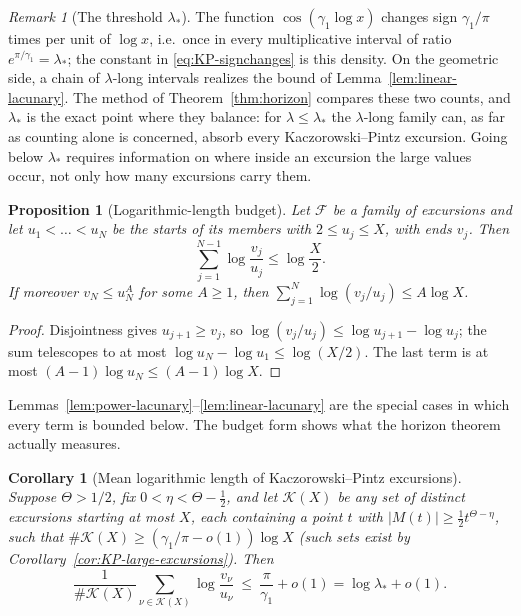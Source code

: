 \documentclass[11pt]{amsart}
\numberwithin{equation}{section}
\theoremstyle{plain}
\newtheorem{proposition}[theorem]{Proposition}
\newtheorem{corollary}[theorem]{Corollary}
\theoremstyle{definition}
\theoremstyle{remark}
\newtheorem{remark}[theorem]{Remark}
\newcommand{\F}{\mathcal{F}}
\begin{document}
\begin{remark}[The threshold $\lambda_*$]
\label{rem:lambda-star}
The function $\cos(\gamma_1\log x)$ changes sign $\gamma_1/\pi$ times per
unit of $\log x$, i.e.\ once in every multiplicative interval of ratio
$e^{\pi/\gamma_1}=\lambda_*$; the constant in \eqref{eq:KP-signchanges} is
this density. On the geometric side, a chain of $\lambda$-long intervals
realizes the bound of Lemma~\ref{lem:linear-lacunary}. The method of
Theorem~\ref{thm:horizon} compares these two counts, and $\lambda_*$ is the
exact point where they balance: for $\lambda\le\lambda_*$ the $\lambda$-long
family can, as far as counting alone is concerned, absorb every
Kaczorowski--Pintz excursion. Going below $\lambda_*$ requires information
on where inside an excursion the large values occur, not only how many
excursions carry them.
\end{remark}

\begin{proposition}[Logarithmic-length budget]
\label{prop:log-budget}
Let $\F$ be a family of excursions and let $u_1<\dots<u_N$ be the starts of
its members with $2\le u_j\le X$, with ends $v_j$. Then
\[
\sum_{j=1}^{N-1}\log\frac{v_j}{u_j}\le\log\frac X2 .
\]
If moreover $v_N\le u_N^A$ for some $A\ge1$, then
$\sum_{j=1}^{N}\log(v_j/u_j)\le A\log X$.
\end{proposition}

\begin{proof}
Disjointness gives $u_{j+1}\ge v_j$, so
$\log(v_j/u_j)\le\log u_{j+1}-\log u_j$; the sum telescopes to at most
$\log u_N-\log u_1\le\log(X/2)$. The last term is at most
$(A-1)\log u_N\le(A-1)\log X$.
\end{proof}

Lemmas~\ref{lem:power-lacunary}--\ref{lem:linear-lacunary} are the special
cases in which every term is bounded below. The budget form shows what the
horizon theorem actually measures.

\begin{corollary}[Mean logarithmic length of Kaczorowski--Pintz excursions]
\label{cor:KP-mean-log-length}
Suppose $\Theta>1/2$, fix $0<\eta<\Theta-\frac12$, and let $\mathcal K(X)$
be any set of distinct excursions starting at most $X$, each containing a
point $t$ with $|M(t)|\ge\frac12t^{\Theta-\eta}$, such that
$\#\mathcal K(X)\ge(\gamma_1/\pi-o(1))\log X$ (such sets exist by
Corollary~\ref{cor:KP-large-excursions}). Then
\[
\frac1{\#\mathcal K(X)}\sum_{\nu\in\mathcal K(X)}\log\frac{v_\nu}{u_\nu}
\ \le\ \frac{\pi}{\gamma_1}+o(1)=\log\lambda_*+o(1).
\]
\end{corollary}
\end{document}
